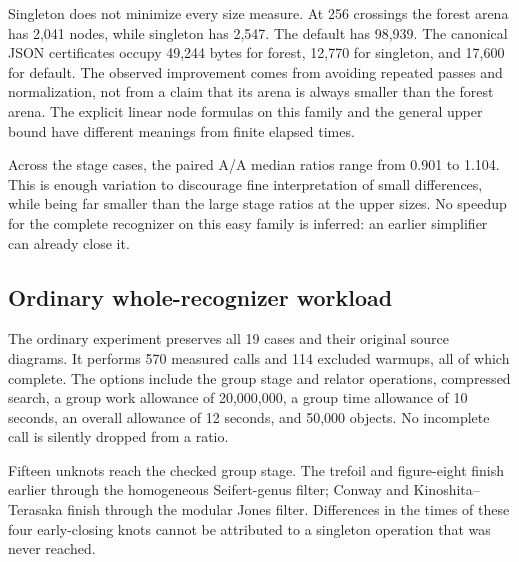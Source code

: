 \begin{table}[tbp]
\centering

\caption{Structural counters for the stage experiment. Every singleton
row uses one batch. Node counts are total allocated search-arena nodes,
including persistent nodes, rather than only reachable output nodes.}
\label{tab:stage-structure}
\end{table}

Singleton does not minimize every size measure. At 256 crossings the
forest arena has 2,041 nodes, while singleton has 2,547. The default has
98,939. The canonical JSON certificates occupy 49,244 bytes for forest,
12,770 for singleton, and 17,600 for default. The observed improvement
comes from avoiding repeated passes and normalization, not from a claim
that its arena is always smaller than the forest arena. The explicit
linear node formulas on this family and the general upper bound have
different meanings from finite elapsed times.

Across the stage cases, the paired A/A median ratios range from 0.901 to
1.104. This is enough variation to discourage fine interpretation of
small differences, while being far smaller than the large stage ratios
at the upper sizes. No speedup for the complete recognizer on this easy
family is inferred: an earlier simplifier can already close it.

\subsection{Ordinary whole-recognizer workload}

The ordinary experiment preserves all 19 cases and their original source
diagrams. It performs 570 measured calls and 114 excluded warmups, all of
which complete. The options include the group stage and relator operations,
compressed search, a group work allowance of 20,000,000, a group time
allowance of 10 seconds, an overall allowance of 12 seconds, and 50,000
objects. No incomplete call is silently dropped from a ratio.

Fifteen unknots reach the checked group stage. The trefoil and figure-eight
finish earlier through the homogeneous Seifert-genus filter; Conway and
Kinoshita--Terasaka finish through the modular Jones filter. Differences in
the times of these four early-closing knots cannot be attributed to a
singleton operation that was never reached.

\begin{table}[tbp]
\centering

\caption{Completed whole-recognizer calls on the preserved ordinary corpus.
$\mathrm U_G$ means an unknot closed through the group stage;
$\mathrm K_S$ and $\mathrm K_J$ are knots closed by the Seifert-genus and
Jones filters. Times are median milliseconds, and the final column is the
paired median ratio. Only Gordian actually uses a singleton batch.}
\label{tab:ordinary}
\end{table}

